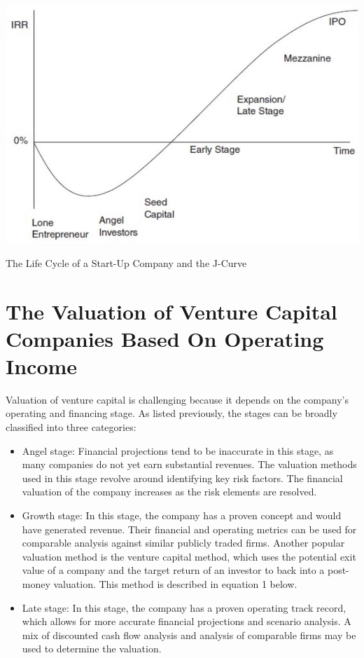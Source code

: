 \documentclass[11pt]{article}
\begin{document}
\begin{center}
\includegraphics[max width=\textwidth]{2024_04_10_d4c2572c2ae315d9c9f2g-5}
\end{center}

The Life Cycle of a Start-Up Company and the J-Curve

\section*{The Valuation of Venture Capital Companies Based On Operating Income}
Valuation of venture capital is challenging because it depends on the company's operating and financing stage. As listed previously, the stages can be broadly classified into three categories:

\begin{itemize}
  \item Angel stage: Financial projections tend to be inaccurate in this stage, as many companies do not yet earn substantial revenues. The valuation methods used in this stage revolve around identifying key risk factors. The financial valuation of the company increases as the risk elements are resolved.
  \item Growth stage: In this stage, the company has a proven concept and would have generated revenue. Their financial and operating metrics can be used for comparable analysis against similar publicly traded firms. Another popular valuation method is the venture capital method, which uses the potential exit value of a company and the target return of an investor to back into a post-money valuation. This method is described in equation 1 below.
  \item Late stage: In this stage, the company has a proven operating track record, which allows for more accurate financial projections and scenario analysis. A mix of discounted cash flow analysis and analysis of comparable firms may be used to determine the valuation.
\end{itemize}
\end{document}
